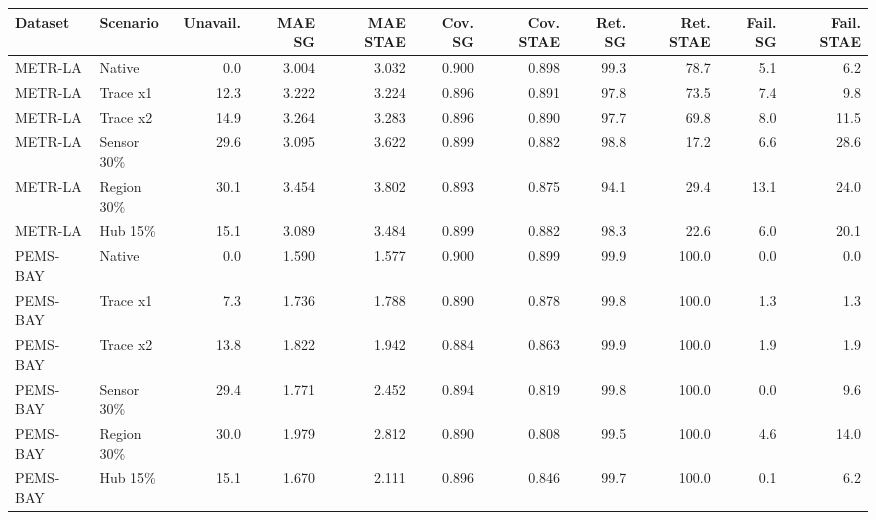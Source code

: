 \begin{tabular}{llrrrrrrrrr}
\toprule
Dataset & Scenario & Unavail. & MAE SG & MAE STAE & Cov. SG & Cov. STAE & Ret. SG & Ret. STAE & Fail. SG & Fail. STAE \\
\midrule
METR-LA & Native & 0.0 & 3.004 & 3.032 & 0.900 & 0.898 & 99.3 & 78.7 & 5.1 & 6.2 \\
METR-LA & Trace x1 & 12.3 & 3.222 & 3.224 & 0.896 & 0.891 & 97.8 & 73.5 & 7.4 & 9.8 \\
METR-LA & Trace x2 & 14.9 & 3.264 & 3.283 & 0.896 & 0.890 & 97.7 & 69.8 & 8.0 & 11.5 \\
METR-LA & Sensor 30\% & 29.6 & 3.095 & 3.622 & 0.899 & 0.882 & 98.8 & 17.2 & 6.6 & 28.6 \\
METR-LA & Region 30\% & 30.1 & 3.454 & 3.802 & 0.893 & 0.875 & 94.1 & 29.4 & 13.1 & 24.0 \\
METR-LA & Hub 15\% & 15.1 & 3.089 & 3.484 & 0.899 & 0.882 & 98.3 & 22.6 & 6.0 & 20.1 \\
PEMS-BAY & Native & 0.0 & 1.590 & 1.577 & 0.900 & 0.899 & 99.9 & 100.0 & 0.0 & 0.0 \\
PEMS-BAY & Trace x1 & 7.3 & 1.736 & 1.788 & 0.890 & 0.878 & 99.8 & 100.0 & 1.3 & 1.3 \\
PEMS-BAY & Trace x2 & 13.8 & 1.822 & 1.942 & 0.884 & 0.863 & 99.9 & 100.0 & 1.9 & 1.9 \\
PEMS-BAY & Sensor 30\% & 29.4 & 1.771 & 2.452 & 0.894 & 0.819 & 99.8 & 100.0 & 0.0 & 9.6 \\
PEMS-BAY & Region 30\% & 30.0 & 1.979 & 2.812 & 0.890 & 0.808 & 99.5 & 100.0 & 4.6 & 14.0 \\
PEMS-BAY & Hub 15\% & 15.1 & 1.670 & 2.111 & 0.896 & 0.846 & 99.7 & 100.0 & 0.1 & 6.2 \\
\bottomrule
\end{tabular}
